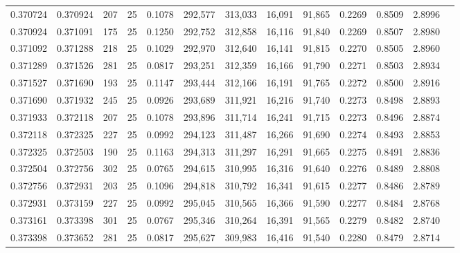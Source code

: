 \begin{tabular}{rrrrrrrrrrrrr}
0.370724 & 0.370924 &   207 &  25 &                                     0.1078 & 292,577 & 313,033 &  16,091 &  91,865 & 0.2269 & 0.8509 & 2.8996 \\
0.370924 & 0.371091 &   175 &  25 &                                     0.1250 & 292,752 & 312,858 &  16,116 &  91,840 & 0.2269 & 0.8507 & 2.8980 \\
0.371092 & 0.371288 &   218 &  25 &                                     0.1029 & 292,970 & 312,640 &  16,141 &  91,815 & 0.2270 & 0.8505 & 2.8960 \\
0.371289 & 0.371526 &   281 &  25 &                                     0.0817 & 293,251 & 312,359 &  16,166 &  91,790 & 0.2271 & 0.8503 & 2.8934 \\
0.371527 & 0.371690 &   193 &  25 &                                     0.1147 & 293,444 & 312,166 &  16,191 &  91,765 & 0.2272 & 0.8500 & 2.8916 \\
0.371690 & 0.371932 &   245 &  25 &                                     0.0926 & 293,689 & 311,921 &  16,216 &  91,740 & 0.2273 & 0.8498 & 2.8893 \\
0.371933 & 0.372118 &   207 &  25 &                                     0.1078 & 293,896 & 311,714 &  16,241 &  91,715 & 0.2273 & 0.8496 & 2.8874 \\
0.372118 & 0.372325 &   227 &  25 &                                     0.0992 & 294,123 & 311,487 &  16,266 &  91,690 & 0.2274 & 0.8493 & 2.8853 \\
0.372325 & 0.372503 &   190 &  25 &                                     0.1163 & 294,313 & 311,297 &  16,291 &  91,665 & 0.2275 & 0.8491 & 2.8836 \\
0.372504 & 0.372756 &   302 &  25 &                                     0.0765 & 294,615 & 310,995 &  16,316 &  91,640 & 0.2276 & 0.8489 & 2.8808 \\
0.372756 & 0.372931 &   203 &  25 &                                     0.1096 & 294,818 & 310,792 &  16,341 &  91,615 & 0.2277 & 0.8486 & 2.8789 \\
0.372931 & 0.373159 &   227 &  25 &                                     0.0992 & 295,045 & 310,565 &  16,366 &  91,590 & 0.2277 & 0.8484 & 2.8768 \\
0.373161 & 0.373398 &   301 &  25 &                                     0.0767 & 295,346 & 310,264 &  16,391 &  91,565 & 0.2279 & 0.8482 & 2.8740 \\
0.373398 & 0.373652 &   281 &  25 &                                     0.0817 & 295,627 & 309,983 &  16,416 &  91,540 & 0.2280 & 0.8479 & 2.8714 \\

\end{tabular}

